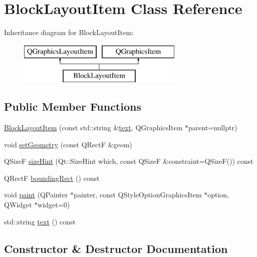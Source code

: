 \hypertarget{class_block_layout_item}{}\section{Block\+Layout\+Item Class Reference}
\label{class_block_layout_item}
Inheritance diagram for Block\+Layout\+Item\+:\begin{figure}[H]
\begin{center}
\leavevmode
\includegraphics[height=2.000000cm]{class_block_layout_item}
\end{center}
\end{figure}
\subsection*{Public Member Functions}
\begin{DoxyCompactItemize}
\item 
\mbox{\hyperlink{class_block_layout_item_ad5ffcaab7d39d6a3c7e29f990acebc21}{Block\+Layout\+Item}} (const std\+::string \&\mbox{\hyperlink{class_block_layout_item_a374055c252f6532b80b31d065ebf1a11}{text}}, Q\+Graphics\+Item $\ast$parent=nullptr)
\item 
void \mbox{\hyperlink{class_block_layout_item_a46955c91f71c6fb77d7f01b102e0daec}{set\+Geometry}} (const Q\+RectF \&geom)
\item 
Q\+SizeF \mbox{\hyperlink{class_block_layout_item_aed00c617a4ca20cc196fe2809382488b}{size\+Hint}} (Qt\+::\+Size\+Hint which, const Q\+SizeF \&constraint=Q\+SizeF()) const
\item 
Q\+RectF \mbox{\hyperlink{class_block_layout_item_a6de4f93c0a2cdcccd5fe9f94f1769906}{bounding\+Rect}} () const
\item 
void \mbox{\hyperlink{class_block_layout_item_a418628ab57eed9f9e9857f1a33149c54}{paint}} (Q\+Painter $\ast$painter, const Q\+Style\+Option\+Graphics\+Item $\ast$option, Q\+Widget $\ast$widget=0)
\item 
std\+::string \mbox{\hyperlink{class_block_layout_item_a374055c252f6532b80b31d065ebf1a11}{text}} () const
\end{DoxyCompactItemize}


\subsection{Constructor \& Destructor Documentation}
\mbox{\label{class_block_layout_item_ad5ffcaab7d39d6a3c7e29f990acebc21}} 
